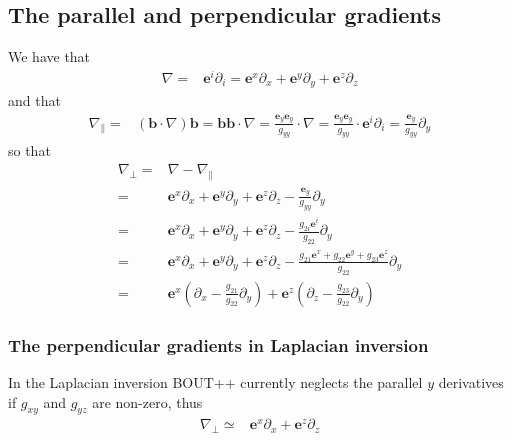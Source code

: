 \documentclass[12pt]{article}
\def\L{\left}
\def\R{\right}
\newcommand{\Grad}{\ensuremath{\nabla}}
\newcommand{\ve}[1]{\ensuremath{\boldsymbol{#1}}}
\begin{document}
\subsection{The parallel and perpendicular gradients}
%
We have that
%
\begin{align*}
    \Grad =& \ve{e}^i \partial_i = \ve{e}^x \partial_x + \ve{e}^y \partial_y +
    \ve{e}^z \partial_z
\end{align*}
%
and that
%
\begin{align*}
    \Grad_\| =& \L(\ve{b} \cdot \Grad\R) \ve{b} = \ve{b} \ve{b} \cdot \Grad =
    \frac{\ve{e}_y \ve{e}_y}{g_{yy}} \cdot \Grad = \frac{\ve{e}_y
    \ve{e}_y}{g_{yy}} \cdot \ve{e}^i \partial_i = \frac{\ve{e}_y}{g_{yy}}
    \partial_y
\end{align*}
%
so that
%
\begin{align*}
    \Grad_\perp =& \Grad - \Grad_\|\\
%
                =& \ve{e}^x \partial_x + \ve{e}^y \partial_y + \ve{e}^z
    \partial_z - \frac{\ve{e}_y}{g_{yy}} \partial_y\\
%
                =& \ve{e}^x \partial_x + \ve{e}^y \partial_y + \ve{e}^z
    \partial_z - \frac{g_{2i}\ve{e}^i}{g_{22}} \partial_y\\
%
                =& \ve{e}^x \partial_x + \ve{e}^y \partial_y + \ve{e}^z
    \partial_z - \frac{g_{21}\ve{e}^x +g_{22}\ve{e}^y +g_{23}\ve{e}^z
    }{g_{22}}\partial_y\\
%
                =& \ve{e}^x \L(\partial_x - \frac{g_{21}}{g_{22}}\partial_y\R)
    +  \ve{e}^z \L(\partial_z - \frac{g_{23}}{g_{22}}\partial_y\R)
\end{align*}
%


\subsubsection{The perpendicular gradients in Laplacian inversion}
%
In the Laplacian inversion BOUT++ currently neglects the parallel $y$
derivatives if $g_{xy}$ and $g_{yz}$ are non-zero, thus
%
\begin{align*}
    \Grad_\perp \simeq& \ve{e}^x \partial_x +  \ve{e}^z \partial_z
\end{align*}
%
\end{document}
